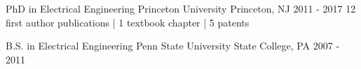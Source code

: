 

\begin{cventries}

  \cventry
    {PhD in Electrical Engineering} %
    {Princeton University} %
    {Princeton, NJ} %
    {2011 - 2017} %
    { 12 first author publications | 1 textbook chapter | 5 patents
    }

  \cventry
    {B.S. in Electrical Engineering}
    {Penn State University}
    {State College, PA}
    {2007 - 2011}
    {}

\end{cventries}
